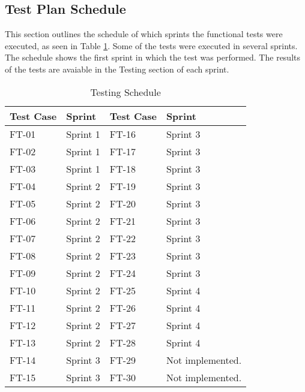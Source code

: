 \subsection*{Test Plan Schedule}

This section outlines the schedule of which sprints the functional tests were executed, as seen in Table \ref{table:testschedule}. Some of the tests were executed in several sprints. The schedule shows the first sprint in which the test was performed. The results of the tests are avaiable in the Testing section of each sprint.


\begin{table}[h]
\centering
\begin{tabular}{| l | l || l | l |}
	\rowcolor{lightgray}
	\hline
	{\bf Test Case} & {\bf Sprint} & {\bf Test Case} & {\bf Sprint} \\ \hline
	FT-01 & Sprint 1 & FT-16 & Sprint 3 \\ \hline
	FT-02 & Sprint 1 & FT-17 & Sprint 3 \\ \hline
	FT-03 & Sprint 1 & FT-18 & Sprint 3 \\ \hline
	FT-04 & Sprint 2 & FT-19 & Sprint 3	\\ \hline
	FT-05 & Sprint 2 & FT-20 & Sprint 3 \\ \hline
	FT-06 & Sprint 2 & FT-21 & Sprint 3 \\ \hline
	FT-07 & Sprint 2 & FT-22 & Sprint 3	\\ \hline
	FT-08 & Sprint 2 & FT-23 & Sprint 3 \\ \hline
	FT-09 & Sprint 2 & FT-24 & Sprint 3 \\ \hline
	FT-10 & Sprint 2 & FT-25 & Sprint 4 \\ \hline
	FT-11 & Sprint 2 & FT-26 & Sprint 4 \\ \hline
	FT-12 & Sprint 2 & FT-27 & Sprint 4 \\ \hline 
	FT-13 & Sprint 2 & FT-28 & Sprint 4 \\ \hline
	FT-14 & Sprint 3 & FT-29 & Not implemented. \\ \hline
	FT-15 & Sprint 3 & FT-30 & Not implemented. \\ \hline
\end{tabular}
\caption{Testing Schedule}
\label{table:testschedule}
\end{table}